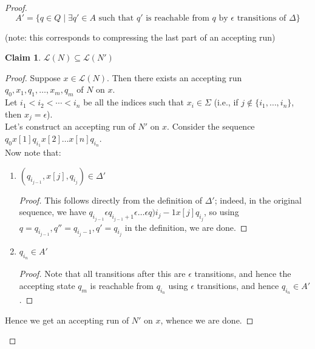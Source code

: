 \documentclass[a4paper]{article}
\newtheorem{claim}{Claim}
\newcommand{\mc}{\mathcal}
\begin{document}
\begin{proof}
    $$A' = \{q \in Q \mid \exists q' \in A \text{ such that } q' \text{ is reachable from } q \text{ by } \epsilon \text{ transitions of } \Delta\}$$

    (note: this corresponds to compressing the last part of an accepting run)\\

    \begin{claim}
        $\mc{L}(N) \subseteq \mc{L}(N')$
    \end{claim}

    \begin{proof}
        Suppose $x \in \mc{L}(N)$. Then there exists an accepting run $q_0, x_1, q_1, \ldots, x_m, q_m$ of $N$ on $x$.\\

        Let $i_1 < i_2 < \cdots < i_n$ be all the indices such that $x_i \in \Sigma$ (i.e., if $j \not \in \{i_1, \ldots, i_n\}$, then $x_j = \epsilon$).\\

        Let's construct an accepting run of $N'$ on $x$. Consider the sequence $q_0 x[1] q_{i_1} x[2] \ldots x[n] q_{i_n}$.\\

        Now note that:

        \begin{enumerate}
            \item $(q_{i_{j - 1}}, x[j], q_{i_j}) \in \Delta'$
                \begin{proof}
                    This follows directly from the definition of $\Delta'$; indeed, in the original sequence, we have $q_{i_{j-1}} \epsilon q_{i_{j-1}+1} \epsilon \ldots \epsilon q){i_j - 1} x[j]
                    q_{i_j}$, so using $q = q_{i_{j-1}}, q'' = q_{i_j - 1}, q' = q_{i_j}$ in the definition, we are done.
                \end{proof}
            \item $q_{i_n} \in A'$
                \begin{proof}
                    Note that all transitions after this are $\epsilon$ transitions, and hence the accepting state $q_m$ is reachable from $q_{i_n}$ using $\epsilon$ transitions, and hence $q_{i_n} \in A'$.
                \end{proof}
        \end{enumerate}

        Hence we get an accepting run of $N'$ on $x$, whence we are done.
    \end{proof}


\end{proof}
\end{document}
